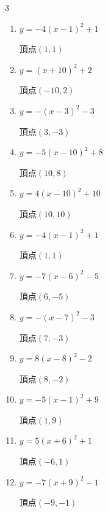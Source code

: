 \begin{multicols}{3}
\begin{enumerate}
  \item $\displaystyle y=-4\left( x-1\right)^{2}+1$

        $\displaystyle 頂点\left( 1 , 1 \right)$

  \item $\displaystyle y=\left( x+10\right)^{2}+2$

        $\displaystyle 頂点\left( -10 , 2 \right)$

  \item $\displaystyle y=-\left( x-3\right)^{2}-3$

        $\displaystyle 頂点\left( 3 , -3 \right)$

  \item $\displaystyle y=-5\left( x-10\right)^{2}+8$

        $\displaystyle 頂点\left( 10 , 8 \right)$

  \item $\displaystyle y=4\left( x-10\right)^{2}+10$

        $\displaystyle 頂点\left( 10 , 10 \right)$

  \item $\displaystyle y=-4\left( x-1\right)^{2}+1$

        $\displaystyle 頂点\left( 1 , 1 \right)$

  \item $\displaystyle y=-7\left( x-6\right)^{2}-5$

        $\displaystyle 頂点\left( 6 , -5 \right)$

  \item $\displaystyle y=-\left( x-7\right)^{2}-3$

        $\displaystyle 頂点\left( 7 , -3 \right)$

  \item $\displaystyle y=8\left( x-8\right)^{2}-2$

        $\displaystyle 頂点\left( 8 , -2 \right)$

  \item $\displaystyle y=-5\left( x-1\right)^{2}+9$

        $\displaystyle 頂点\left( 1 , 9 \right)$

  \item $\displaystyle y=5\left( x+6\right)^{2}+1$

        $\displaystyle 頂点\left( -6 , 1 \right)$

  \item $\displaystyle y=-7\left( x+9\right)^{2}-1$

        $\displaystyle 頂点\left( -9 , -1 \right)$


\end{enumerate}
\end{multicols}
